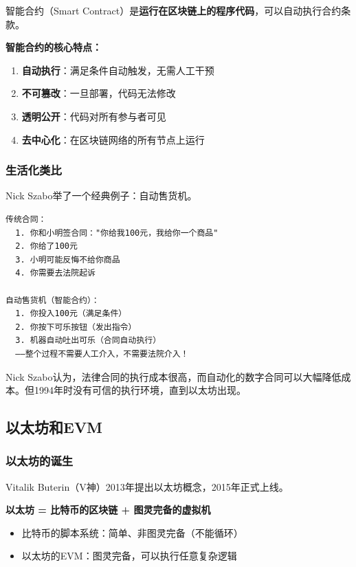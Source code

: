 ﻿\documentclass[12pt,a4paper]{article}
\begin{document}
智能合约（Smart Contract）是\textbf{运行在区块链上的程序代码}，可以自动执行合约条款。

\begin{theorybox}
\textbf{智能合约的核心特点：}
\begin{enumerate}
\item \textbf{自动执行}：满足条件自动触发，无需人工干预
\item \textbf{不可篡改}：一旦部署，代码无法修改
\item \textbf{透明公开}：代码对所有参与者可见
\item \textbf{去中心化}：在区块链网络的所有节点上运行
\end{enumerate}
\end{theorybox}

\subsubsection{生活化类比}

Nick Szabo举了一个经典例子：自动售货机。

\begin{lstlisting}
传统合同：
  1. 你和小明签合同："你给我100元，我给你一个商品"
  2. 你给了100元
  3. 小明可能反悔不给你商品
  4. 你需要去法院起诉

自动售货机（智能合约）：
  1. 你投入100元（满足条件）
  2. 你按下可乐按钮（发出指令）
  3. 机器自动吐出可乐（合同自动执行）
  ——整个过程不需要人工介入，不需要法院介入！
\end{lstlisting}

Nick Szabo认为，法律合同的执行成本很高，而自动化的数字合同可以大幅降低成本。但1994年时没有可信的执行环境，直到以太坊出现。

\subsection{以太坊和EVM}

\subsubsection{以太坊的诞生}

Vitalik Buterin（V神）2013年提出以太坊概念，2015年正式上线。

\textbf{以太坊 = 比特币的区块链 + 图灵完备的虚拟机}

\begin{itemize}[leftmargin=1.5em]
\item 比特币的脚本系统：简单、非图灵完备（不能循环）
\item 以太坊的EVM：图灵完备，可以执行任意复杂逻辑
\end{itemize}
\end{document}
